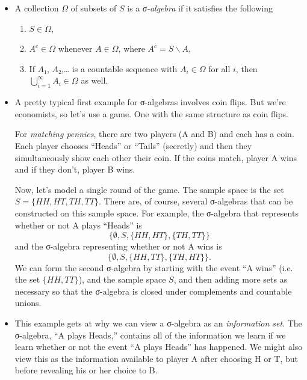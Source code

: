 \begin{itemize}
\item %
  \begin{defn} A collection $Ω$ of subsets of $S$ is a
    \emph{σ-algebra} if it satisfies the following
    \begin{enumerate}
    \item $S ∈ Ω$,
    \item $A^c ∈ Ω$ whenever $A ∈ Ω$, where $A^c = S ∖ A$,
    \item If $A₁$, $A₂$,… is a countable sequence with $A_i ∈ Ω$ for
      all $i$, then $⋃_{i=1}^∞ A_i ∈ Ω$ as well.
    \end{enumerate}
  \end{defn}

\item A pretty typical first example for σ-algebras involves coin
  flips.  But we're economists, so let's use a game.  One with the
  same structure as coin flips.
  \begin{ex}
    For \emph{matching pennies}, there are two players (A and B) and
    each has a coin.  Each player chooses ``Heads'' or ``Tails''
    (secretly) and then they simultaneously show each other their
    coin.  If the coins match, player A wins and if they don't, player
    B wins.

    Now, let's model a single round of the game.  The sample space is
    the set $S = \{HH, HT, TH, TT\}$. There are, of course, several σ-algebras that can be
    constructed on this sample space.  For example, the σ-algebra that
    represents whether or not A plays ``Heads'' is
    \begin{equation*}
      \{∅, S, \{HH,HT\}, \{TH,TT\}\}
    \end{equation*}
    and the σ-algebra representing whether or not A wins is
    \begin{equation*}
      \{∅, S, \{HH,TT\}, \{TH,HT\}\}.
    \end{equation*}
    We can form the second σ-algebra by starting with the event ``A
    wins'' (i.e. the set $\{HH, TT\}$), and the sample space $S$, and
    then adding more sets as necessary so that the σ-algebra is closed
    under complements and countable unions.
  \end{ex}

\item This example gets at why we can view a σ-algebra as an
  \emph{information set}.  The σ-algebra, ``A plays Heads,'' contains
  all of the information we learn if we learn whether or not the event
  ``A plays Heads'' has happened.  We might
  also view this as the information available to player A after choosing
  H or T, but before revealing his or her choice to B.


\end{itemize}
